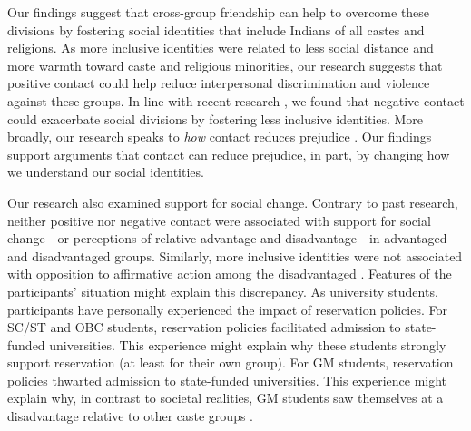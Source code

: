 \documentclass[12pt, a4paper]{article}
\begin{document}
Our findings suggest that cross-group friendship can help to overcome these divisions by fostering social identities that include Indians of all castes and religions. As more inclusive identities were related to less social distance and more warmth toward caste and religious minorities, our research suggests that positive contact could help reduce interpersonal discrimination and violence against these groups. In line with recent research \parencite{hayward_toward_2017}, we found that negative contact could exacerbate social divisions by fostering less inclusive identities. More broadly, our research speaks to \emph{how} contact reduces prejudice \parencite{pettigrew_how_2008}. Our findings support arguments \parencite{gaertner_reducing_2000, pettigrew_intergroup_1998} that contact can reduce prejudice, in part, by changing how we understand our social identities.

Our research also examined support for social change. Contrary to past research, neither positive nor negative contact \parencite{hayward_how_2018, reimer_intergroup_2017} were associated with support for social change---or perceptions of relative advantage and disadvantage---in advantaged \parencite{selvanathan_whites_2018, dixon_intergroup_2007} and disadvantaged \parencite{dixon_beyond_2012} groups. Similarly, more inclusive identities were not associated with opposition to affirmative action among the disadvantaged \parencite{dixon_attitudes_2012}. Features of the participants’ situation might explain this discrepancy. As university students, participants have personally experienced the impact of reservation policies. For SC/ST and OBC students, reservation policies facilitated admission to state-funded universities. This experience might explain why these students strongly support reservation (at least for their own group). For GM students, reservation policies thwarted admission to state-funded universities. This experience might explain why, in contrast to societal realities, GM students saw themselves at a disadvantage relative to other caste groups \parencite[see][]{norton_whites_2011}.
\end{document}
